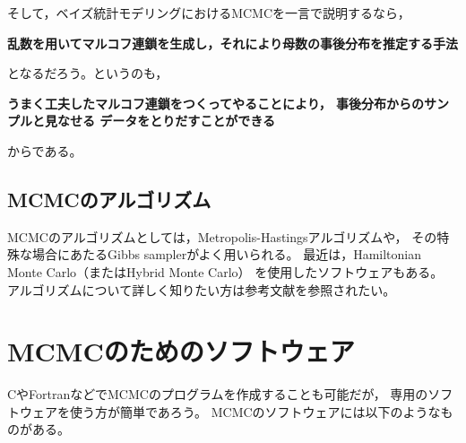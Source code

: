 \documentclass[11pt,uplatex]{jsarticle}
\begin{document}
そして，ベイズ統計モデリングにおけるMCMCを一言で説明するなら，

\vspace{2zw}
\hspace{10mm}
\begin{minipage}{110mm}
\begin{breakbox}
\noindent
{\large\bf 乱数を用いてマルコフ連鎖を生成し，それにより母数の事後分布を推定する手法}
\end{breakbox}
\end{minipage}
\vspace{2zw}

\noindent
となるだろう。というのも，

\vspace{2zw}
\hspace{10mm}
\begin{minipage}{110mm}
\begin{breakbox}
\noindent
{\large\bf うまく工夫したマルコフ連鎖をつくってやることにより，
事後分布からのサンプルと見なせる
データをとりだすことができる}
\end{breakbox}
\end{minipage}
\vspace{2zw}

\noindent
からである。

\subsection{MCMCのアルゴリズム}

MCMCのアルゴリズムとしては，Metropolis-Hastingsアルゴリズムや，
その特殊な場合にあたるGibbs samplerがよく用いられる。\cite{PRML,Iba2005,Toyoda,Watanabe}
最近は，Hamiltonian Monte Carlo（またはHybrid Monte Carlo）
\cite{PRML,BDA3,Toyoda2015,Watanabe}
を使用したソフトウェアもある。
アルゴリズムについて詳しく知りたい方は参考文献を参照されたい。

\pagebreak

\section{MCMCのためのソフトウェア}
CやFortranなどでMCMCのプログラムを作成することも可能だが，
専用のソフトウェアを使う方が簡単であろう。
MCMCのソフトウェアには以下のようなものがある。
\end{document}
